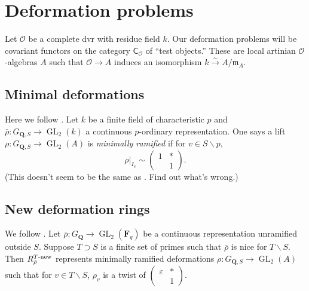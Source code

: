 \documentclass{amsart}
\DeclareMathOperator{\GL}{GL}
\newcommand{\cO}{\mathcal{O}}
\newcommand{\dF}{\mathbf{F}}
\newcommand{\dQ}{\mathbf{Q}}
\newcommand{\fm}{\mathfrak{m}}
\newcommand{\iso}{\xrightarrow\sim}
\begin{document}
\section{Deformation problems}

Let $\cO$ be a complete dvr with residue field $k$. Our deformation problems 
will be covariant functors on the category $\mathsf{C}_\cO$ of ``test 
objects.'' These are local artinian $\cO$-algebras $A$ such that 
$\cO\to A$ induces an isomorphism $k\iso A/\fm_A$. 


\subsection{Minimal deformations}

Here we follow \cite[\S2.1]{khare-2003}. Let $k$ be a finite field of 
characteristic $p$ and $\bar\rho:G_{\dQ,S}\to \GL_2(k)$ a continuous 
$p$-ordinary representation. One says a lift $\rho:G_{\dQ,S}\to \GL_2(A)$ is 
\emph{minimally ramified} if for $v\in S\smallsetminus p$, 
\[
  \rho|_{I_v}\sim \begin{pmatrix} 1 & \ast \\ & 1 \end{pmatrix} .
\]
\textsf{(This doesn't seem to be the same as 
\cite[p.180]{khare-ramakrishna-2003}. Find out what's wrong.)}


\subsection{New deformation rings}

We follow \cite[df.1]{khare-ramakrishna-2003}. 
Let $\bar\rho:G_\dQ\to \GL_2(\dF_q)$ be a continuous representation unramified 
outside $S$. Suppose $T\supset S$ is a finite set of primes such that 
$\bar\rho$ is nice for $T\smallsetminus S$. Then 
$R_{\bar\rho}^{T\textnormal{-new}}$ represents minimally ramified deformations 
$\rho:G_{\dQ,S} \to \GL_2(A)$ such that for $v\in T\smallsetminus S$, 
$\rho_v$ is a twist of $\begin{pmatrix} \varepsilon & \ast \\ & 1 \end{pmatrix}$. 







\end{document}
